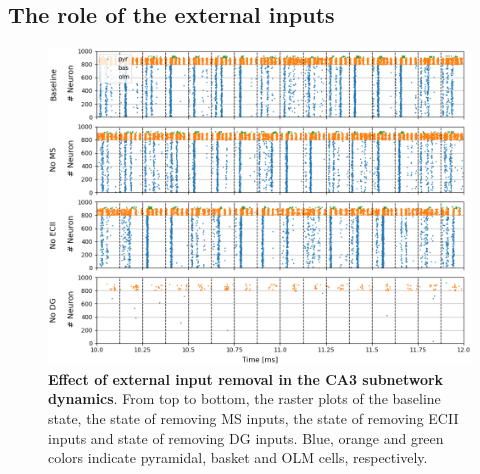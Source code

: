 \documentclass[../main.tex]{subfiles}
\begin{document}
\subsection{The role of the external inputs}
\begin{figure}[!htb]
    \centering
    \includegraphics[width=\textwidth]{chapter4/figures/removing_external_inputs/removing_inputs_ca3_rasters.png}
    \caption{\textbf{Effect of external input removal in the CA3 subnetwork dynamics}.
    From top to bottom, the raster plots of the baseline state, the state of removing MS inputs, the state of removing ECII inputs and state of removing DG inputs.
    Blue, orange and green colors indicate pyramidal, basket and OLM cells, respectively.}
    \label{fig:inputs-ca3-rasters}
\end{figure}
\end{document}
